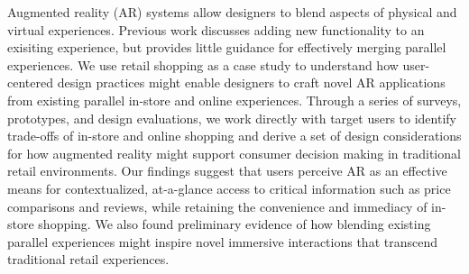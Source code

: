 Augmented reality (AR) systems allow designers to blend aspects of physical and virtual experiences. Previous work discusses adding new functionality to an exisiting experience, but provides little guidance for effectively merging parallel experiences. We use retail shopping as a case study to understand how user-centered design practices might enable designers to craft novel AR applications from existing parallel in-store and online experiences. Through a series of surveys, prototypes, and design evaluations, we work directly with target users to identify trade-offs of in-store and online shopping and derive a set of design considerations for how augmented reality might support consumer decision making in traditional retail environments. Our findings suggest that users perceive AR as an effective means for contextualized, at-a-glance access to critical information such as price comparisons and reviews, while retaining the convenience and immediacy of in-store shopping. We also found preliminary evidence of how blending existing parallel experiences might inspire novel immersive interactions that transcend traditional retail experiences.
